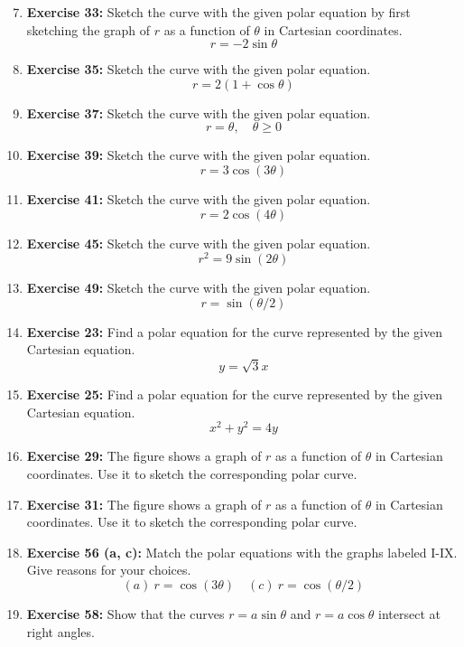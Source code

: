 \documentclass[12pt, a4paper]{article}
\begin{document}
\begin{enumerate}
    \setcounter{enumi}{6}
    \item \textbf{Exercise 33:} Sketch the curve with the given polar equation by first sketching the graph of $r$ as a function of $\theta$ in Cartesian coordinates.
    \[ r = -2\sin\theta \]

    \item \textbf{Exercise 35:} Sketch the curve with the given polar equation.
    \[ r = 2(1+\cos\theta) \]

    \item \textbf{Exercise 37:} Sketch the curve with the given polar equation.
    \[ r = \theta, \quad \theta \ge 0 \]

    \item \textbf{Exercise 39:} Sketch the curve with the given polar equation.
    \[ r = 3\cos(3\theta) \]

    \item \textbf{Exercise 41:} Sketch the curve with the given polar equation.
    \[ r = 2\cos(4\theta) \]

    \item \textbf{Exercise 45:} Sketch the curve with the given polar equation.
    \[ r^2 = 9\sin(2\theta) \]

    \item \textbf{Exercise 49:} Sketch the curve with the given polar equation.
    \[ r = \sin(\theta/2) \]

    \item \textbf{Exercise 23:} Find a polar equation for the curve represented by the given Cartesian equation.
    \[ y = \sqrt{3}x \]

    \item \textbf{Exercise 25:} Find a polar equation for the curve represented by the given Cartesian equation.
    \[ x^2 + y^2 = 4y \]

    \item \textbf{Exercise 29:} The figure shows a graph of $r$ as a function of $\theta$ in Cartesian coordinates. Use it to sketch the corresponding polar curve.

    \item \textbf{Exercise 31:} The figure shows a graph of $r$ as a function of $\theta$ in Cartesian coordinates. Use it to sketch the corresponding polar curve.

    \item \textbf{Exercise 56 (a, c):} Match the polar equations with the graphs labeled I-IX. Give reasons for your choices.
    \[ (a) \ r = \cos(3\theta) \quad (c) \ r = \cos(\theta/2) \]

    \item \textbf{Exercise 58:} Show that the curves $r = a\sin\theta$ and $r = a\cos\theta$ intersect at right angles.
\end{enumerate}
\end{document}
